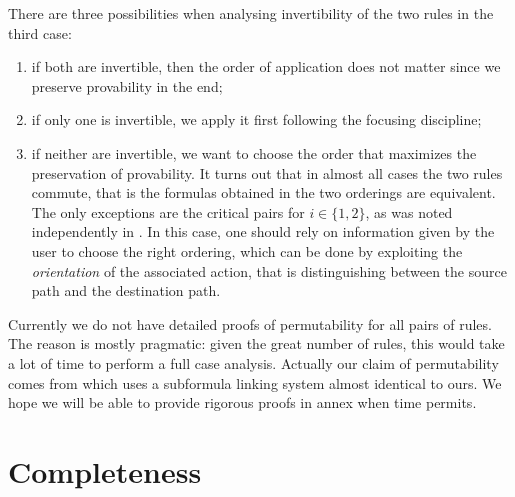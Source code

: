 There are three possibilities when analysing invertibility of the two rules in
the third case:
\begin{enumerate}
  \item if both are invertible, then the order of application does not matter
  since we preserve provability in the end;
  \item if only one is invertible, we apply it first following the focusing
  discipline;
  \item if neither are invertible, we want to choose the order that maximizes
  the preservation of provability. It turns out that in almost all cases the two
  rules commute, that is the formulas obtained in the two orderings are
  equivalent. The only exceptions are the critical pairs  for $i \in \{1,2\}$, as was noted independently in
  . In this case, one should rely on
  information given by the user to choose the right ordering, which can be done
  by exploiting the \emph{orientation} of the associated  action, that is
  distinguishing between the source path and the destination path.
\end{enumerate}
Currently we do not have detailed proofs of permutability for all pairs of
rules. The reason is mostly pragmatic: given the great number of rules, this
would take a lot of time to perform a full case analysis. Actually our claim of
permutability comes from \cite{DBLP:conf/cade/Chaudhuri21} which uses a
subformula linking system almost identical to ours. We hope we will be able to
provide rigorous proofs in annex when time permits.

\section{Completeness}

